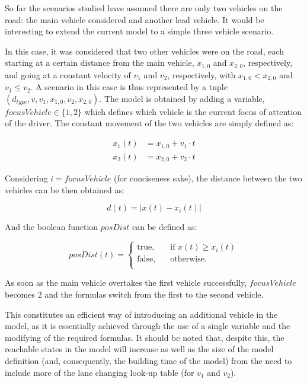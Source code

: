 So far the scenarios studied have assumed there are only two vehicles on the road: the main vehicle considered and another lead vehicle. It would be interesting to extend the current model to a simple three vehicle scenario. 

In this case, it was considered that two other vehicles were on the road, each starting at a certain distance from the main vehicle, $x_{1,0}$ and $x_{2,0}$, respectively, and going at a constant velocity of $v_1$ and $v_2$, respectively, with $x_{1,0} < x_{2,0}$ and $v_1 \leq v_2$. A scenario in this case is thus represented by a tuple $(d_{type}, v, v_1, x_{1,0}, v_2, x_{2,0})$. The model is obtained by adding a variable, $focusVehicle \in \{1,2\}$ which defines which vehicle is the current focus of attention of the driver. The constant movement of the two vehicles are simply defined as:

\begin{equation}
\begin{aligned}
	x_1(t) & = x_{1,0} + v_1\cdot t\\
	x_2(t) & = x_{2,0} + v_2\cdot t
\end{aligned}
\end{equation}

Considering $i = focusVehicle$ (for conciseness sake), the distance between the two vehicles can be then obtained as:

\begin{equation}
	d(t) = \lvert x(t) - x_i(t) \rvert
\end{equation}

And the boolean function $posDist$ can be defined as:

\begin{equation}
posDist(t) = 
     \begin{cases}
       \text{true,} &\quad\text{if }x(t) \geq x_i(t)\\
       \text{false,} &\quad\text{otherwise.} \\
     \end{cases}
\end{equation}

As soon as the main vehicle overtakes the first vehicle successfully, $focusVehicle$ becomes $2$ and the formulas switch from the first to the second vehicle. 

This constitutes an efficient way of introducing an additional vehicle in the model, as it is essentially achieved through the use of a single variable and the modifying of the required formulas. It should be noted that, despite this, the reachable states in the model will increase as well as the size of the model definition (and, consequently, the building time of the model) from the need to include more of the lane changing look-up table (for $v_1$ and $v_2$). 

